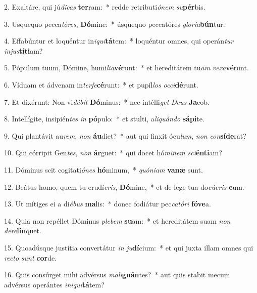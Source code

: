 2. Exaltáre, qui jú\textit{di}\textit{cas} \textbf{ter}ram:~*  redde retributi\textit{ó}\textit{nem} \textit{su}\textbf{pér}bis.\

3. Usquequo pecca\textit{tó}\textit{res}, \textbf{Dó}mine:~*  úsquequo peccatóres \textit{glo}\textit{ri}\textit{a}\textbf{bún}tur:\

4. Effabúntur et loquéntur in\textit{i}\textit{qui}\textbf{tá}tem:~*  loquéntur omnes, qui operán\textit{tur} \textit{in}\textit{jus}\textbf{tí}\textbf{ti}am?\

5. Pópulum tuum, Dómine, humi\textit{li}\textit{a}\textbf{vé}runt:~*  et hereditátem tu\textit{am} \textit{ve}\textit{xa}\textbf{vé}runt.\

6. Víduam et ádvenam in\textit{ter}\textit{fe}\textbf{cé}runt:~*  et pupíl\textit{los} \textit{oc}\textit{ci}\textbf{dé}runt.\

7. Et dixérunt: Non vi\textit{dé}\textit{bit} \textbf{Dó}minus:~*  nec intélli\textit{get} \textit{De}\textit{us} \textbf{Ja}cob.\

8. Intellígite, insipién\textit{tes} \textit{in} \textbf{pó}pulo:~*  et stulti, a\textit{li}\textit{quán}\textit{do} \textbf{sá}\textbf{pi}te.\

9. Qui plantávit au\textit{rem}, \textit{non} \textbf{áu}diet?~*  aut qui finxit ócu\textit{lum}, \textit{non} \textit{con}\textbf{sí}\textbf{de}rat?\

10. Qui córripit Gen\textit{tes}, \textit{non} \textbf{ár}guet:~*  qui docet hó\textit{mi}\textit{nem} \textit{sci}\textbf{én}\textbf{ti}am?\

11. Dóminus scit cogitati\textit{ó}\textit{nes} \textbf{hó}minum,~*  \textit{quón}\textit{i}\textit{am} \textbf{va}\textbf{næ} sunt.\

12. Beátus homo, quem tu erudí\textit{e}\textit{ris}, \textbf{Dó}mine,~*  et de lege tua do\textit{cú}\textit{e}\textit{ris} \textbf{e}um.\

13. Ut mítiges ei a di\textit{é}\textit{bus} \textbf{ma}lis:~*  donec fodiátur pec\textit{ca}\textit{tó}\textit{ri} \textbf{fó}\textbf{ve}a.\

14. Quia non repéllet Dóminus \textit{ple}\textit{bem} \textbf{su}am:~*  et hereditátem suam \textit{non} \textit{de}\textit{re}\textbf{lín}quet.\

15. Quoadúsque justítia convertátur \textit{in} \textit{ju}\textbf{dí}cium:~*  et qui juxta illam omnes qui \textit{rec}\textit{to} \textit{sunt} \textbf{cor}de.\

16. Quis consúrget mihi advérsus \textit{ma}\textit{li}\textbf{gnán}tes?~*  aut quis stabit mecum advérsus operántes \textit{in}\textit{i}\textit{qui}\textbf{tá}tem?\

